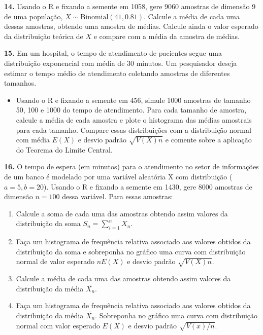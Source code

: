 \documentclass[
]{book}
\providecommand{\tightlist}{%
  \setlength{\itemsep}{0pt}\setlength{\parskip}{0pt}}
\begin{document}
\textbf{14.} Usando o R e fixando a semente em 1058, gere 9060 amostras de
dimensão 9 de uma população, \(X\sim \text{Binomial}(41,0.81)\). Calcule a
média de cada uma dessas amostras, obtendo uma amostra de médias.
Calcule ainda o valor esperado da distribuição teórica de \(X\) e compare
com a média da amostra de médias.

\textbf{15.} Em um hospital, o tempo de atendimento de pacientes segue uma
distribuição exponencial com média de 30 minutos. Um pesquisador deseja
estimar o tempo médio de atendimento coletando amostras de diferentes
tamanhos.

\begin{itemize}
\tightlist
\item
  Usando o R e fixando a semente em 456, simule 1000 amostras de
  tamanho 50, 100 e 1000 do tempo de atendimento. Para cada tamanho de
  amostra, calcule a média de cada amostra e plote o histograma das
  médias amostrais para cada tamanho. Compare essas distribuições com
  a distribuição normal com média \(E(X)\) e desvio padrão
  \(\sqrt{V(X)n}\) e comente sobre a aplicação do Teorema do Limite
  Central.
\end{itemize}

\textbf{16.} O tempo de espera (em minutos) para o atendimento no setor de
informações de um banco é modelado por uma variável aleatória X com
distribuição (\(a=5, b=20\)). Usando o R e fixando a
semente em 1430, gere 8000 amostras de dimensão \(n=100\) dessa variável.
Para essas amostras:

\begin{enumerate}
\def\labelenumi{(\alph{enumi})}
\item
  Calcule a soma de cada uma das amostras obtendo assim valores da
  distribuição da soma \(S_{n} = \sum_{i=1}^{n}X_{n}\).
\item
  Faça um histograma de frequência relativa associado aos valores
  obtidos da distribuição da soma e sobreponha no gráfico uma curva com
  distribuição normal de valor esperado \(nE(X)\) e desvio padrão
  \(\sqrt{V(X)n}\).
\item
  Calcule a média de cada uma das amostras obtendo assim valores
  da distribuição da média \(\bar{X_{n}}\).
\item
  Faça um histograma de frequência relativa associado aos valores
  obtidos da distribuição da média \(\bar{X_{n}}\). Sobreponha no gráfico
  uma curva com distribuição normal com valor esperado \(E(X)\) e desvio
  padrão \(\sqrt{V(x)/n}\).
\end{enumerate}
\end{document}
